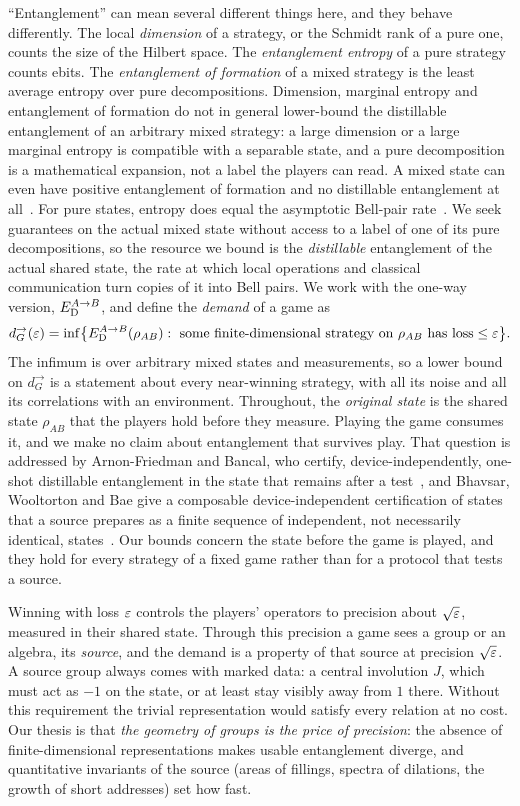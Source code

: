 ``Entanglement'' can mean several different things here, and they behave differently. The local \emph{dimension} of a strategy,
or the Schmidt rank of a pure one, counts the size of the Hilbert space. The \emph{entanglement entropy} of a pure strategy counts
ebits. The \emph{entanglement of formation} of a mixed strategy is the least average entropy over pure decompositions. Dimension,
marginal entropy and entanglement of formation do not in general lower-bound the distillable entanglement of an arbitrary mixed
strategy: a large dimension or a large marginal entropy is compatible with a separable state, and a pure decomposition is a
mathematical expansion, not a label the players can read. A mixed state can even have positive entanglement of formation
and no distillable entanglement at all~\cite{HHH98}. For pure states, entropy does equal the asymptotic Bell-pair
rate~\cite{BBPS96}. We
seek guarantees on the actual mixed state without access to a label of one of its pure decompositions, so the resource we bound
is the \emph{distillable} entanglement of the actual shared state, the rate at which local operations and classical communication
turn copies of it into Bell pairs. We work with the one-way version, $E_{\mathrm D}^{A\to B}$, and define the \emph{demand} of a game as
\[
d_G^\to(\varepsilon)=\inf\bigl\{E_{\mathrm D}^{A\to B}(\rho_{AB}):\ \text{some finite-dimensional strategy on }\rho_{AB}\text{ has loss}\le\varepsilon\bigr\}.
\]
The infimum is over arbitrary mixed states and measurements, so a lower bound on $d^\to_G$ is a statement about every
near-winning strategy, with all its noise and all its correlations with an environment. Throughout, the \emph{original state}
is the shared state $\rho_{AB}$ that the players hold before they measure. Playing the game consumes it, and we make no claim
about entanglement that survives play. That question is addressed by Arnon-Friedman and Bancal, who certify,
device-independently, one-shot distillable entanglement in the state that remains after a test~\cite{AFB18}, and Bhavsar,
Wooltorton and Bae give a composable device-independent certification of states that a source prepares as a finite sequence of
independent, not necessarily identical, states~\cite{BWB25}. Our bounds concern the state before the game is played, and they hold
for every strategy of a fixed game rather than for a protocol that tests a source.

Winning with loss $\varepsilon$ controls the players' operators to precision about $\sqrt{\varepsilon}$, measured in their shared state. Through
this precision a game sees a group or an algebra, its \emph{source}, and the demand is a property of that source at precision
$\sqrt{\varepsilon}$. A source group always comes with marked data: a central involution $J$, which must act as $-1$ on the state, or at
least stay visibly away from $1$ there. Without this requirement the trivial representation would satisfy every relation at no
cost. Our thesis is that \emph{the geometry of groups is the price of precision}: the absence of finite-dimensional
representations makes usable entanglement diverge, and quantitative invariants of the source (areas of fillings, spectra of
dilations, the growth of short addresses) set how fast.

